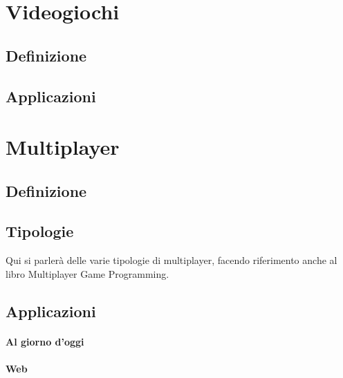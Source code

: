 \section{Videogiochi}\label{sec:Videogiochi}
    \subsection{Definizione}\label{subsec:VideogiochiDef}
    \subsection{Applicazioni}\label{subsec:VideogiochiTipologie}

\section{Multiplayer}\label{sec:Multiplayer}
    \subsection{Definizione}\label{subsec:MultiDef}
    \subsection{Tipologie}\label{subsec:MultiTipologie}
    Qui si parlerà delle varie tipologie di multiplayer, facendo riferimento anche al libro Multiplayer Game Programming.
    \subsection{Applicazioni}\label{subsec:CoopApplicazioni}
        \paragraph{Al giorno d'oggi}\label{par:MultiOggi}
        \paragraph{Web}\label{par:CoopWeb}
